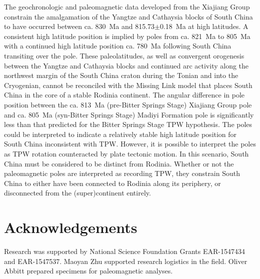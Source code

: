 The geochronologic and paleomagnetic data developed from the Xiajiang Group constrain the amalgamation of the Yangtze and Cathaysia blocks of South China to have occurred between ca. 830~Ma and 815.73$\pm$0.18~Ma at high latitudes. A consistent high latitude position is implied by poles from ca. 821~Ma to 805~Ma with a continued high latitude position ca. 780~Ma following South China transiting over the pole. These paleolatitudes, as well as convergent orogenesis between the Yangtze and Cathaysia blocks and continued arc activity along the northwest margin of the South China craton during the Tonian and into the Cryogenian, cannot be reconciled with the Missing Link model that places South China in the core of a stable Rodinia continent. The angular difference in pole position between the ca. 813~Ma (pre-Bitter Springs Stage) Xiajiang Group pole and ca. 805~Ma (syn-Bitter Springs Stage) Madiyi Formation pole is significantly less than that predicted for the Bitter Springs Stage TPW hypothesis. The poles could be interpreted to indicate a relatively stable high latitude position for South China inconsistent with TPW. However, it is possible to interpret the poles as TPW rotation counteracted by plate tectonic motion. In this scenario, South China must be considered to be distinct from Rodinia. Whether or not the paleomagnetic poles are interpreted as recording TPW, they constrain South China to either have been connected to Rodinia along its periphery, or disconnected from the (super)continent entirely.

\section{Acknowledgements}

Research was supported by National Science Foundation Grants EAR-1547434 and EAR-1547537. Maoyan Zhu supported research logistics in the field. Oliver Abbitt prepared specimens for paleomagnetic analyses.

